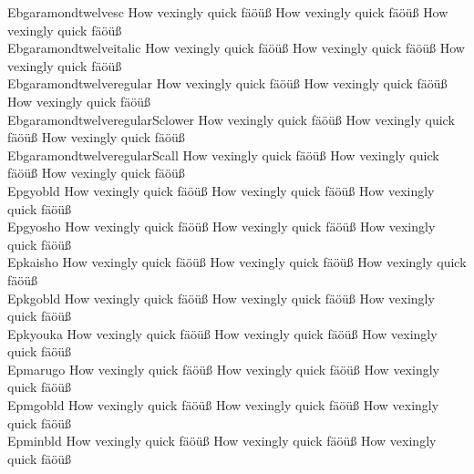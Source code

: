 \begin{tabbing}
Ebgaramondtwelvesc \> {\mktsStyleNormal{}How vexingly quick fäöüß} {\mktsFontfileEbgaramondtwelvesc{}How vexingly quick fäöüß} {\mktsStyleItalic{}How vexingly quick fäöüß} \\
Ebgaramondtwelveitalic \> {\mktsStyleNormal{}How vexingly quick fäöüß} {\mktsFontfileEbgaramondtwelveitalic{}How vexingly quick fäöüß} {\mktsStyleItalic{}How vexingly quick fäöüß} \\
Ebgaramondtwelveregular \> {\mktsStyleNormal{}How vexingly quick fäöüß} {\mktsFontfileEbgaramondtwelveregular{}How vexingly quick fäöüß} {\mktsStyleItalic{}How vexingly quick fäöüß} \\
EbgaramondtwelveregularSclower \> {\mktsStyleNormal{}How vexingly quick fäöüß} {\mktsFontfileEbgaramondtwelveregularSclower{}How vexingly quick fäöüß} {\mktsStyleItalic{}How vexingly quick fäöüß} \\
EbgaramondtwelveregularScall \> {\mktsStyleNormal{}How vexingly quick fäöüß} {\mktsFontfileEbgaramondtwelveregularScall{}How vexingly quick fäöüß} {\mktsStyleItalic{}How vexingly quick fäöüß} \\
Epgyobld \> {\mktsStyleNormal{}How vexingly quick fäöüß} {\mktsFontfileEpgyobld{}How vexingly quick fäöüß} {\mktsStyleItalic{}How vexingly quick fäöüß} \\
Epgyosho \> {\mktsStyleNormal{}How vexingly quick fäöüß} {\mktsFontfileEpgyosho{}How vexingly quick fäöüß} {\mktsStyleItalic{}How vexingly quick fäöüß} \\
Epkaisho \> {\mktsStyleNormal{}How vexingly quick fäöüß} {\mktsFontfileEpkaisho{}How vexingly quick fäöüß} {\mktsStyleItalic{}How vexingly quick fäöüß} \\
Epkgobld \> {\mktsStyleNormal{}How vexingly quick fäöüß} {\mktsFontfileEpkgobld{}How vexingly quick fäöüß} {\mktsStyleItalic{}How vexingly quick fäöüß} \\
Epkyouka \> {\mktsStyleNormal{}How vexingly quick fäöüß} {\mktsFontfileEpkyouka{}How vexingly quick fäöüß} {\mktsStyleItalic{}How vexingly quick fäöüß} \\
Epmarugo \> {\mktsStyleNormal{}How vexingly quick fäöüß} {\mktsFontfileEpmarugo{}How vexingly quick fäöüß} {\mktsStyleItalic{}How vexingly quick fäöüß} \\
Epmgobld \> {\mktsStyleNormal{}How vexingly quick fäöüß} {\mktsFontfileEpmgobld{}How vexingly quick fäöüß} {\mktsStyleItalic{}How vexingly quick fäöüß} \\
Epminbld \> {\mktsStyleNormal{}How vexingly quick fäöüß} {\mktsFontfileEpminbld{}How vexingly quick fäöüß} {\mktsStyleItalic{}How vexingly quick fäöüß} \\

\end{tabbing}
